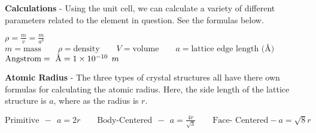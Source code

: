 \documentclass{article}
\begin{document}
\begin{minipage}{2cm}

\end{minipage}

\noindent\textbf{Calculations} - Using the unit cell, we can calculate a variety of different parameters related to the element in question. See the formulas below.
\begin{qq}

	\begin{center}
		$ \rho= \frac{m}{v}=\frac{m}{a^3}$\\
		\vspace{3pt}
		$m=\text{mass}\qquad \rho=\text{density} \qquad V=\text{volume}\qquad a=\text{lattice edge length (\AA)}$\\
		\vspace{3pt}
		$\text{Angstrom}=\textup{~\AA}=1\times 10^{-10} \:\: m$
	\end{center}

\end{qq}

\vspace{10pt}
\noindent\textbf{Atomic Radius} - The three types of crystal structures all have there own formulas for calculating the atomic radius. Here, the side length of the lattice structure is $a$, where as the radius is $r$.
\begin{qq}

	\begin{center}
		$ \text{Primitive}\:\: - \:\: a=2r \qquad \text{Body-Centered}\:\: - \:\: a=\frac{4r}{\sqrt{3}}\qquad \text{Face- Centered} - a=\sqrt{8}r$
	\end{center}

\end{qq}

\pagebreak
\vspace{2cm}
\end{document}
